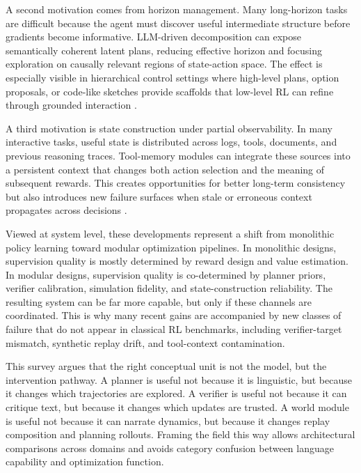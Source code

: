 \documentclass[pdflatex,sn-mathphys-num]{sn-jnl}
\begin{document}
A second motivation comes from horizon management. Many long-horizon tasks are difficult because the agent must discover useful intermediate structure before gradients become informative. LLM-driven decomposition can expose semantically coherent latent plans, reducing effective horizon and focusing exploration on causally relevant regions of state-action space. The effect is especially visible in hierarchical control settings where high-level plans, option proposals, or code-like sketches provide scaffolds that low-level RL can refine through grounded interaction \cite{arxiv_p_2303_16563,arxiv_p_2405_01534,arxiv_p_2512_12716,arxiv_p_2601_14140}.

A third motivation is state construction under partial observability. In many interactive tasks, useful state is distributed across logs, tools, documents, and previous reasoning traces. Tool-memory modules can integrate these sources into a persistent context that changes both action selection and the meaning of subsequent rewards. This creates opportunities for better long-term consistency but also introduces new failure surfaces when stale or erroneous context propagates across decisions \cite{arxiv_p_2511_14460,arxiv_p_2602_00994,arxiv_p_2601_07264,arxiv_p_2601_02439}.

Viewed at system level, these developments represent a shift from monolithic policy learning toward modular optimization pipelines. In monolithic designs, supervision quality is mostly determined by reward design and value estimation. In modular designs, supervision quality is co-determined by planner priors, verifier calibration, simulation fidelity, and state-construction reliability. The resulting system can be far more capable, but only if these channels are coordinated. This is why many recent gains are accompanied by new classes of failure that do not appear in classical RL benchmarks, including verifier-target mismatch, synthetic replay drift, and tool-context contamination.

This survey argues that the right conceptual unit is not the model, but the intervention pathway. A planner is useful not because it is linguistic, but because it changes which trajectories are explored. A verifier is useful not because it can critique text, but because it changes which updates are trusted. A world module is useful not because it can narrate dynamics, but because it changes replay composition and planning rollouts. Framing the field this way allows architectural comparisons across domains and avoids category confusion between language capability and optimization function.
\end{document}

